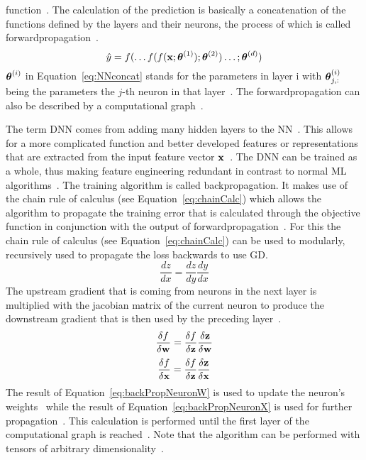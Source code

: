 function~\citep{goodfellow_deep_2016}.
The calculation of the prediction is basically a concatenation of the functions defined by the
layers and their neurons, the process of which is called forwardpropagation~\citep{goodfellow_deep_2016}.
\begin{equation}\label{eq:NNconcat}
    \hat{y}=f(\ldots f(f(\textbf{x};\boldsymbol{\theta}^{(1)});\boldsymbol{\theta}^{(2)})\ldots;\boldsymbol{\theta}^{(d)})
\end{equation}
$\boldsymbol{\theta}^{(i)}$ in Equation~\ref{eq:NNconcat} stands for the parameters in layer i with $\boldsymbol{\theta}^{(i)}_{j,:}$
being the parameters the $j$-th neuron in that layer~\citep{goodfellow_deep_2016}.
The forwardpropagation can also be described by a computational graph~\citep{goodfellow_deep_2016}.

The term \ac{DNN} comes from adding many hidden layers to the \ac{NN}~\citep{shrestha_review_2019}.
This allows for a more complicated function and better developed features or representations that
are extracted from the input feature vector $\textbf{x}$~\citep{oyedotun_deep_2015}.
The \ac{DNN} can be trained as a whole, thus making feature engineering redundant in contrast to
normal \ac{ML} algorithms~\citep{arpteg_software_2018}.
The training algorithm is called backpropagation.
It makes use of the chain rule of calculus (see Equation~\ref{eq:chainCalc}) which allows the
algorithm to propagate the training error that is calculated through the objective function in
conjunction with the output of forwardpropagation~\citep{goodfellow_deep_2016}.
For this the chain rule of calculus (see Equation~\ref{eq:chainCalc}) can be used to modularly,
recursively used to propagate the loss backwards to use \ac{GD}.
\begin{equation}\label{eq:chainCalc}
    \frac{dz}{dx}=\frac{dz}{dy}\frac{dy}{dx}
\end{equation}
The upstream gradient that is coming from neurons in the next layer is multiplied with the
jacobian matrix of the current neuron to produce the downstream gradient that is then used by
the preceding layer~\citep{boue_deep_2018,goodfellow_deep_2016}.
\begin{equation}\label{eq:backPropNeuronW}
    \frac{\delta f}{\delta\textbf{w}} = \frac{\delta f}{\delta\textbf{z}} \frac{\delta\textbf{z}}{\delta\textbf{w}}
\end{equation}
\begin{equation}\label{eq:backPropNeuronX}
    \frac{\delta f}{\delta\textbf{x}} = \frac{\delta f}{\delta\textbf{z}}\frac{\delta\textbf{z}}{\delta\textbf{x}}
\end{equation}
The result of Equation~\ref{eq:backPropNeuronW} is used to update the neuron's weights \w\ while
the result of Equation~\ref{eq:backPropNeuronX} is used for further propagation~\citep{boue_deep_2018}.
This calculation is performed until the first layer of the computational graph is
reached~\citep{goodfellow_deep_2016}.
Note that the algorithm can be performed with tensors of arbitrary
dimensionality~\citep{goodfellow_deep_2016}.

